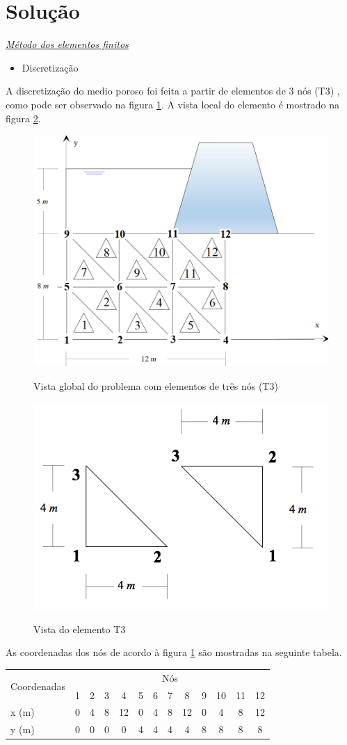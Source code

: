 \documentclass{article} %
\begin{document}
\newpage

\section*{Solução}

\vspace{10mm}


\underline{\large \textit{Método dos elementos finitos}}\\

\begin{itemize}
	\item Discretização
\end{itemize}

A discretização do medio poroso foi feita a partir de elementos de 3 nós (T3) , como pode ser observado na figura \ref{global}. A vista local do elemento é mostrado na figura \ref{local}.

\begin{figure}[H]
	\centering
	\caption{Vista global do problema com elementos de três nós (T3)}	\includegraphics[width=0.65\linewidth]{elemento1}	
	\label{global}	
\end{figure}
\begin{figure}[H]
	\centering
	\caption{Vista do elemento T3}	\includegraphics[width=0.45\linewidth]{local}	
	\label{local}	
\end{figure}
As coordenadas dos nós de acordo à figura \ref{global} são mostradas na seguinte tabela.
\begin{table}[H]
	\centering
	\begin{tabular}{@{}lcccccccccccc@{}}
		\toprule
		\multirow{2}{*}{Coordenadas} & \multicolumn{12}{c}{Nós} \\ \cmidrule(l){2-13} 
		& 1 & 2 & 3 & 4 & 5 & 6 & 7 & 8 & 9 & 10 & 11 & 12 \\ \midrule
		x (m) & 0 & 4 & 8 & 12 & 0 & 4 & 8 & 12 & 0 & 4 & 8 & 12 \\
		y (m) & 0 & 0 & 0 & 0 & 4 & 4 & 4 & 4 & 8 & 8 & 8 & 8 \\ \bottomrule
	\end{tabular}
\end{table}
\end{document}
